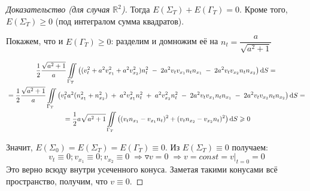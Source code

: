 \documentclass[../main.tex]{subfiles}
\begin{document}
\begin{proof}[Доказательство (для случая $\mathbb{R}^2$)]
Тогда $ E(\Sigma_T)+E(\Gamma_T)=0 $. 
Кроме того, $ E(\Sigma_T)\geq 0 $ (под интегралом сумма квадратов).

Покажем, что и $ E(\Gamma_T)\geq 0 $: разделим и домножим её на $ n_t=\dfrac{a}{\sqrt{a^2+1}} $

\begin{multline*}
  \frac{1}{2}\frac{\sqrt{a^2+1}}{a}\iint\limits_{\Gamma_T}\left((v^2_t+a^2v^2_{x_1}+a^2v^2_{x_2})n^2_t \; - \; 2a^2v_{t}v_{x_1}n_tn_{x_1} \; - \; 2a^2v_{t}v_{x_2}n_tn_{x_2}\right)\mathrm{d}S = {}\\
  {} =\frac{1}{2}\frac{\sqrt{a^2+1}}{a}\iint\limits_{\Gamma_T}\left(v^2_ta^2(n^2_{x_1} + n^2_{x_2})\; + \; a^2v^2_{x_1}n^2_t \; + \; a^2v^2_{x_2}n^2_t\; - \; 2a^2v_{t}v_{x_1}n_tn_{x_1} \; - \; 2a^2v_{t}v_{x_2}n_tn_{x_2}\right)\mathrm{d}S = {}\\
  {} = \frac{1}{2}a\sqrt{a^2+1}\iint\limits_{\Gamma_T}\left((v_tn_{x_1} -v_{x_1}n_t)^2+(v_tn_{x_2}-v_{x_2}n_t)^2\right)\mathrm{d}S\geqslant 0  
\end{multline*}

Значит, $ E(\Sigma_0)=E(\Sigma_T)=E(\Gamma_T)\equiv 0.$
\; Из $ E(\Sigma_T)\equiv0 $ получаем: 
$$ v_t\equiv0; v_{x_1}\equiv0; v_{x_2}\equiv0 \; \Rightarrow \triangledown v  = 0 \; \Rightarrow v = const = v|_{t=0}=0 
$$
Это верно всюду внутри усеченного конуса.
Заметая такими конусами всё пространство, получим, что $ v \equiv 0 $.
\end{proof}
\end{document}
